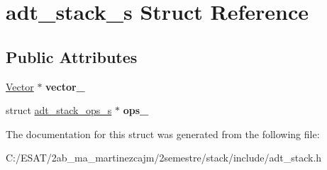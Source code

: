\hypertarget{structadt__stack__s}{}\section{adt\+\_\+stack\+\_\+s Struct Reference}
\label{structadt__stack__s}
\subsection*{Public Attributes}
\begin{DoxyCompactItemize}
\item 
\mbox{\label{structadt__stack__s_a883fcdc234ea42df09f263e4f61d5cff}} 
\hyperlink{structadt__vector__s}{Vector} $\ast$ {\bfseries vector\+\_\+}
\item 
\mbox{\label{structadt__stack__s_ad84aead3b8f9868599f5f9c26b62b87d}} 
struct \hyperlink{structadt__stack__ops__s}{adt\+\_\+stack\+\_\+ops\+\_\+s} $\ast$ {\bfseries ops\+\_\+}
\end{DoxyCompactItemize}


The documentation for this struct was generated from the following file\+:\begin{DoxyCompactItemize}
\item 
C\+:/\+E\+S\+A\+T/2ab\+\_\+ma\+\_\+martinezcajm/2semestre/stack/include/adt\+\_\+stack.\+h\end{DoxyCompactItemize}
